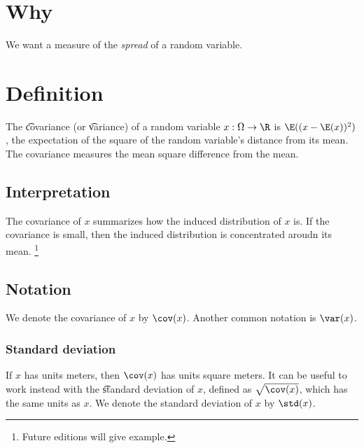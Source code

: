 
\section*{Why}

We want a measure of the \textit{spread} of a random variable.

\section*{Definition}

The \t{covariance} (or \t{variance}) of a random variable $x: \Omega  \to \R $ is $\E ((x - \E (x))^2)$, the expectation of the square of the random variable's distance from its mean.
The covariance measures the mean square difference from the mean.

\subsection*{Interpretation}

The covariance of $x$ summarizes how  the induced distribution of $x$ is.
If the covariance is small, then the induced distribution is concentrated aroudn its mean.
  \ifhmode\unskip\fi\footnote{
Future editions will give example.
  }

\subsection*{Notation}

We denote the covariance of $x$ by $\cov(x)$.
Another common notation is $\var(x)$.

\subsubsection*{Standard deviation}

If $x$ has units meters, then $\cov(x)$ has units square meters.
It can be useful to work instead with the \t{standard deviation} of $x$, defined as $\sqrt{\cov(x)}$, which has the same units as $x$.
We denote the standard deviation of $x$ by $\std(x)$.

\blankpage